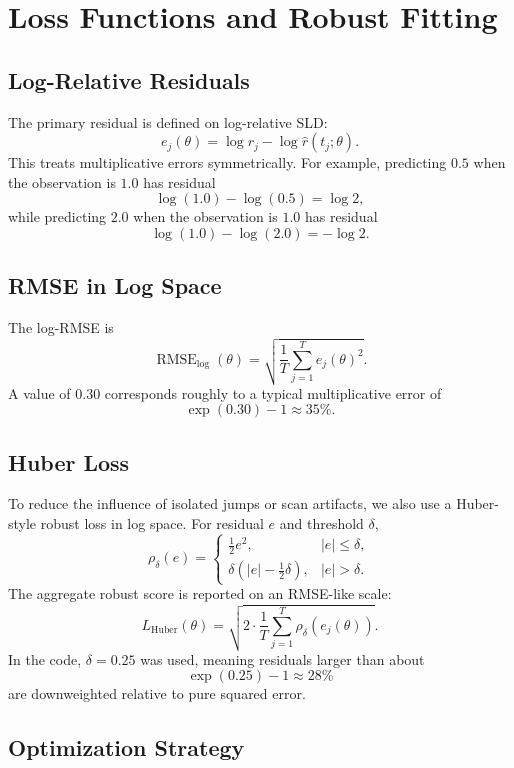 \documentclass[11pt,a4paper]{article}
\begin{document}
\section{Loss Functions and Robust Fitting}

\subsection{Log-Relative Residuals}

The primary residual is defined on log-relative SLD:
\[
    e_j(\theta)
    = \log r_j - \log \hat{r}(t_j;\theta).
\]
This treats multiplicative errors symmetrically. For example, predicting $0.5$ when the observation is $1.0$ has residual
\[
    \log(1.0)-\log(0.5)=\log 2,
\]
while predicting $2.0$ when the observation is $1.0$ has residual
\[
    \log(1.0)-\log(2.0)=-\log 2.
\]

\subsection{RMSE in Log Space}

The log-RMSE is
\[
    \operatorname{RMSE}_{\log}(\theta)
    = \sqrt{\frac{1}{T}\sum_{j=1}^{T} e_j(\theta)^2}.
\]
A value of $0.30$ corresponds roughly to a typical multiplicative error of
\[
    \exp(0.30)-1 \approx 35\%.
\]

\subsection{Huber Loss}

To reduce the influence of isolated jumps or scan artifacts, we also use a Huber-style robust loss in log space. For residual $e$ and threshold $\delta$,
\[
    \rho_\delta(e)
    =
    \begin{cases}
    \frac{1}{2}e^2, & |e|\leq \delta,\\
    \delta(|e|-\frac{1}{2}\delta), & |e|>\delta.
    \end{cases}
\]
The aggregate robust score is reported on an RMSE-like scale:
\[
    L_{\mathrm{Huber}}(\theta)
    = \sqrt{2\cdot \frac{1}{T}\sum_{j=1}^{T}\rho_\delta(e_j(\theta))}.
\]
In the code, $\delta=0.25$ was used, meaning residuals larger than about
\[
    \exp(0.25)-1 \approx 28\%
\]
are downweighted relative to pure squared error.

\subsection{Optimization Strategy}
\end{document}
